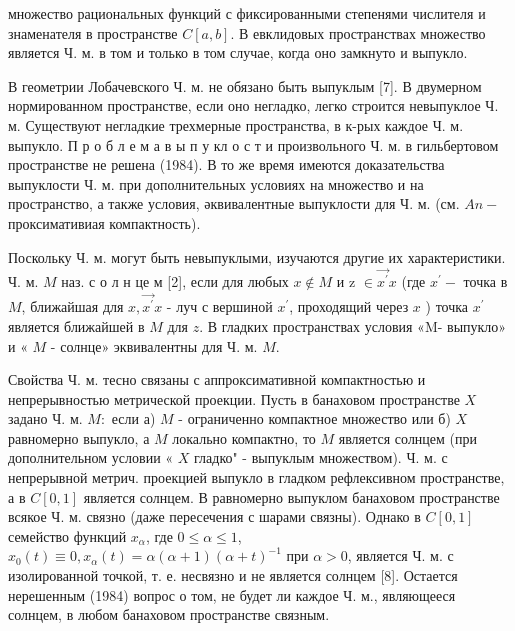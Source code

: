 \documentclass[10pt]{article}
\begin{document}
множество рациональных функций с фиксированными степенями числителя и знаменателя в пространстве $C[a, b]$. В евклидовых пространствах множество является Ч. м. в том и только в том случае, когда оно замкнуто и выпукло.



В геометрии Лобачевского Ч. м. не обязано быть выпуклым [7]. В двумерном нормированном пространстве, если оно негладко, легко строится невыпуклое Ч. м. Существуют негладкие трехмерные пространства, в к-рых каждое Ч. м. выпукло. П р о б л е м а в ы п у кл о с т и произвольного Ч. м. в гильбертовом пространстве не решена (1984). В то же время имеются доказательства выпуклости Ч. м. при дополнительных условиях на множество и на пространство, а также условия, әквивалентные выпуклости для Ч. м. (см. $A n-$ проксимативиая компактность).



Поскольку Ч. м. могут быть невыпуклыми, изучаются другие их характеристики. Ч. м. $M$ наз. с о л н це м [2], если для любых $x \notin M$ и z $\in \overrightarrow{x^{\prime}} x$ (где $x^{\prime}-$ точка в $M$, ближайшая для $x, \overrightarrow{x^{\prime}} x$ - луч с вершиной $x^{\prime}$, проходящий через $x$ ) точка $x^{\prime}$ является ближайшей в $M$ для $z$. В гладких пространствах условия «M- выпукло» и « $M$ - солнце» эквивалентны для Ч. м. $M$.



Свойства Ч. м. тесно связаны с аппроксимативной компактностью и непрерывностью метрической проекции. Пусть в банаховом пространстве $X$ задано Ч. м. $M:$ если а) $M$ - ограниченно компактное множество или б) $X$ равномерно выпукло, а $M$ локально компактно, то $M$ является солнцем (при дополнительном условии « $X$ гладко" - выпуклым множеством). Ч. м. с непрерывной метрич. проекцией выпукло в гладком рефлексивном пространстве, а в $C[0,1]$ является солнцем. В равномерно выпуклом банаховом пространстве всякое Ч. м. связно (даже пересечения с шарами связны). Однако в $C[0,1]$ семейство функций $x_{\alpha}$, где $0 \leqslant \alpha \leqslant 1$, $x_{0}(t) \equiv 0, x_{\alpha}(t)=\alpha(\alpha+1)(\alpha+t)^{-1}$ при $\alpha>0$, является Ч. м. с изолированной точкой, т. е. несвязно и не является солнцем [8]. Остается нерешенным (1984) вопрос о том, не будет ли каждое Ч. м., являющееся солнцем, в любом банаховом пространстве связным.
\end{document}
